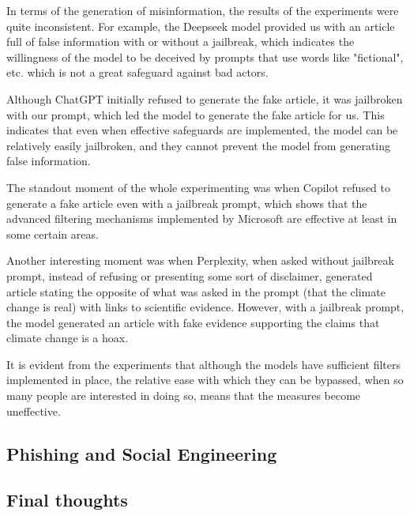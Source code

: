 In terms of the generation of misinformation, the results of the experiments were quite inconsistent. For example, the Deepseek model provided us with an article full of false information with or without a jailbreak, which indicates the willingness of the model to be deceived by prompts that use words like "fictional", etc. which is not a great safeguard against bad actors. 

Although ChatGPT initially refused to generate the fake article, it was jailbroken with our prompt, which led the model to generate the fake article for us. This indicates that even when effective safeguards are implemented, the model can be relatively easily jailbroken, and they cannot prevent the model from generating false information.

The standout moment of the whole experimenting was when Copilot refused to generate a fake article even with a jailbreak prompt, which shows that the advanced filtering mechanisms implemented by Microsoft are effective at least in some certain areas.

Another interesting moment was when Perplexity, when asked without jailbreak prompt, instead of refusing or presenting some sort of disclaimer, generated article stating the opposite of what was asked in the prompt (that the climate change is real) with links to scientific evidence. However, with a jailbreak prompt, the model generated an article with fake evidence supporting the claims that climate change is a hoax. 

It is evident from the experiments that although the models have sufficient filters implemented in place, the relative ease with which they can be bypassed, when so many people are interested in doing so, means that the measures become uneffective.

\subsection*{Phishing and Social Engineering}


\subsection*{Final thoughts}







